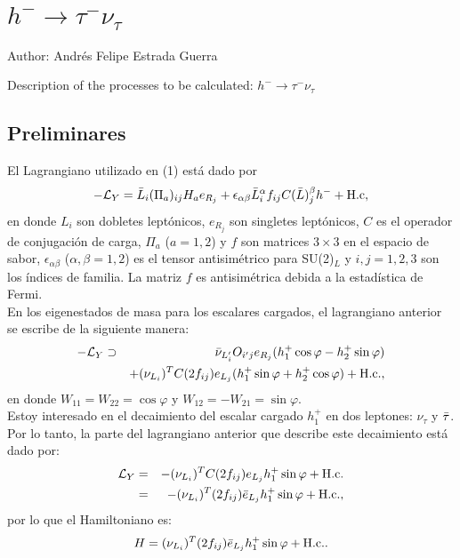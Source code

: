 \chapter{$h^-\to \tau^-\nu_{\tau}$}
Author: Andr\'es Felipe Estrada Guerra


Description of the processes to be calculated: $h^-\to \tau^-\nu_{\tau}$

\section{Preliminares}

El Lagrangiano utilizado en (1) está dado por
\begin{eqnarray}\label{lagrangiano-1}
-\mathcal{L}_Y=\Bar{L}_i(\Pi_a)_{ij}H_ae_{R_j}+\epsilon_{\alpha\beta}\Bar{L}^\alpha_if_{ij}C(\Bar{L})^\beta_jh^-+\mbox{H.c},
\end{eqnarray}
en donde $L_i$ son dobletes leptónicos, $e_{R_j}$ son singletes leptónicos, $C$ es el operador de conjugación de carga, $\Pi_a$
($a=1,2$) y $f$ son matrices $3\times3$ en el espacio de sabor, $\epsilon_{\alpha\beta}$ ($\alpha,\beta=1,2$) es el tensor
antisimétrico para SU(2)$_L$ y $i,j=1,2,3$ son los índices de familia. La matriz $f$ es antisimétrica debida a la estadística de
Fermi.\\
En los eigenestados de masa para los escalares cargados, el lagrangiano anterior se escribe de la siguiente manera:
\begin{eqnarray}\label{lagrangiano-2}
-\mathcal{L}_Y  & \supset & \Bar{\nu}_{L_i'}O_{i'j}e_{R_j}(h_1^+\cos\varphi -h_2^+\sin\varphi) \nonumber \\
& & +(\nu_{L_i})^TC(2f_{ij})e_{L_j}(h_1^+\sin\varphi +h_2^+\cos\varphi)+\mbox{H.c.},
\end{eqnarray}
en donde $W_{11}=W_{22}=\cos\varphi$ y $W_{12}=-W_{21}=\sin\varphi$.\\
Estoy interesado en  el decaimiento del escalar cargado $h_1^+$ en dos leptones: $\nu_\tau$ y $\Bar{\tau}$. Por lo tanto, la
parte del lagrangiano anterior que describe este decaimiento está dado por:
\begin{eqnarray}\label{lagrangiano-3}
\mathcal{L}_Y&=&-(\nu_{L_i})^TC(2f_{ij})e_{L_j}h_1^+\sin\varphi +\mbox{H.c.} \nonumber \\
&=&-(\nu_{L_i})^T(2f_{ij})\Bar{e}_{L_j}h_1^+\sin\varphi +\mbox{H.c.},
\end{eqnarray}
por lo que el Hamiltoniano es:
\begin{eqnarray}\label{hamilton-1}
H=(\nu_{L_i})^T(2f_{ij})\Bar{e}_{L_j}h_1^+\sin\varphi +\mbox{H.c.}.
\end{eqnarray}
